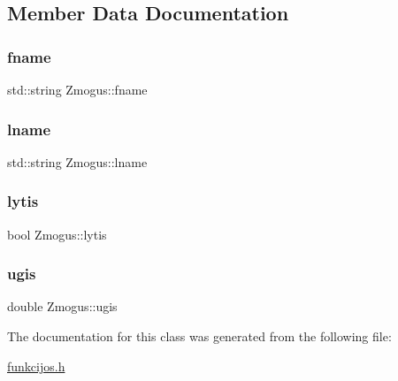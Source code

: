 \subsection{Member Data Documentation}
\mbox{\label{class_zmogus_af32f2351f1bfac2dae5f1fd4ff493a83}} 
\subsubsection{\texorpdfstring{fname}{fname}}
{\footnotesize\ttfamily std\+::string Zmogus\+::fname\hspace{0.3cm}{\ttfamily [protected]}}

\mbox{\label{class_zmogus_ace05f2507ccb382d614b73f37b933a61}} 
\subsubsection{\texorpdfstring{lname}{lname}}
{\footnotesize\ttfamily std\+::string Zmogus\+::lname\hspace{0.3cm}{\ttfamily [protected]}}

\mbox{\label{class_zmogus_a853560cbd25814bd3c0a29be8ac19c66}} 
\subsubsection{\texorpdfstring{lytis}{lytis}}
{\footnotesize\ttfamily bool Zmogus\+::lytis\hspace{0.3cm}{\ttfamily [protected]}}

\mbox{\label{class_zmogus_a4eb993c2f44180ab49869ac0b23827b5}} 
\subsubsection{\texorpdfstring{ugis}{ugis}}
{\footnotesize\ttfamily double Zmogus\+::ugis\hspace{0.3cm}{\ttfamily [protected]}}



The documentation for this class was generated from the following file\+:\begin{DoxyCompactItemize}
\item 
\mbox{\hyperlink{funkcijos_8h}{funkcijos.\+h}}\end{DoxyCompactItemize}
